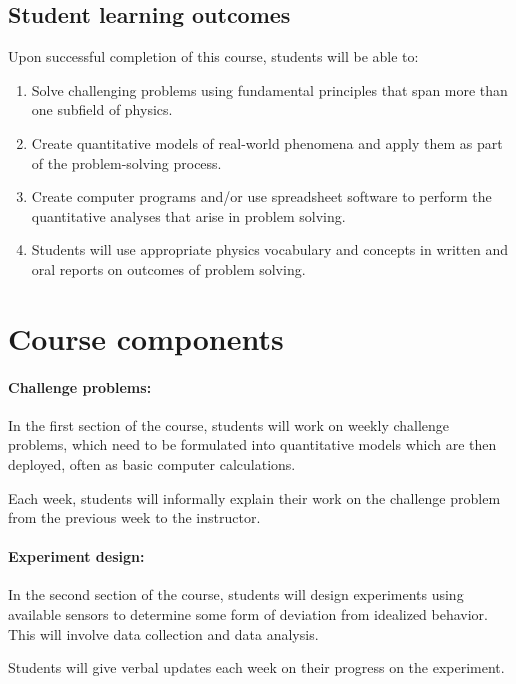 \documentclass{syllabus}
\begin{document}
\subsection*{Student learning outcomes} 
\noindent

Upon successful completion of this course, students will be able to:
\begin{enumerate}[label=\textcolor{CarthageDark}{\bfseries\arabic*.}]
    \item Solve challenging problems using fundamental principles that span more than one subfield of physics.
    \item Create quantitative models of real-world phenomena and apply them as part of the problem-solving process.
    \item Create computer programs and/or use spreadsheet software to perform the quantitative analyses that arise in problem solving.
    \item Students will use appropriate physics vocabulary and concepts in written and oral reports on outcomes of problem solving.
\end{enumerate}



\section*{Course components}

\paragraph{Challenge problems:} In the first section of the course, students will work on weekly challenge problems, which need to be formulated into quantitative models which are then deployed, often as basic computer calculations. 

Each week, students will informally explain their work on the challenge problem from the previous week to the instructor.

\paragraph{Experiment design:} In the second section of the course, students will design experiments using available sensors to determine some form of deviation from idealized behavior. This will involve data collection and data analysis.

Students will give verbal updates each week on their progress on the experiment.
\end{document}
